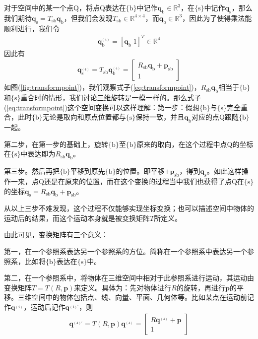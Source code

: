 \documentclass[12pt, a4paper, article, UTF8]{ctexart}
\begin{document}
对于空间中的某一个点Q，将点Q表达在$\{\text{b}\}$中记作$\mathbf{q}_\text{b}\in \mathbb{R}^3$，在$\{\text{s}\}$中记作$\mathbf{q}_\text{s}$，那么我们期待$\mathbf{q}_\text{s} = T_\text{sb}\mathbf{q}_\text{b}$，但我们会发现$T_\text{sb}\in\mathbb{R}^{4\times 4}$，而$\mathbf{q}_\text{b}\in\mathbb{R}^3$，因此为了使得乘法能顺利进行，我们令
\begin{align}
\mathbf{q}_\text{b}^{{}_{(4)}} = [\mathbf{q}_\text{b} \; 1]^T \in \mathbb{R}^4
\end{align}
因此有
\begin{align}
\mathbf{q}_\text{s}^{{}_{(4)}} = T_\text{sb}\mathbf{q}_\text{b}^{{}_{(4)}}  = \begin{bmatrix}
R_\text{sb} \mathbf{q}_\text{b} + \mathbf{p}_\text{sb} \\
1
\end{bmatrix} \label{eq:transformpoint}
\end{align}
如图(\ref{fig:transformpoint})，我们观察式子(\ref{eq:transformpoint})，$R_\text{sb}\mathbf{q}_\text{b}$相当于$\{\text{b}\}$和$\{\text{s}\}$重合时的情形，我们讨论三维旋转是一模一样的。那么式子(\ref{eq:transformpoint})这个空间变换可以这样理解：第一步：假想$\{\text{b}\}$与$\{\text{s}\}$完全重合，此时$\{\text{b}\}$无论是取向和原点位置都与$\{\text{s}\}$保持一致，并且$\mathbf{q}_\text{b}$对应的点Q跟随$\{\text{b}\}$一起。

第二步，在第一步的基础上，旋转$\{\text{b}\}$至$\{\text{b}\}$原来的取向，在这个过程中点Q的坐标在$\{\text{s}\}$中表达即为$R_\text{sb}\mathbf{q}_\text{b}$。

第三步。然后再把$\{\text{b}\}$平移到原先$\{\text{b}\}$的位置。即平移$+\mathbf{p}_\text{sb}$，得到$\mathbf{q}_\text{s}$。如此这样操作一来，点Q还是在原来的位置，而在这个变换的过程当中我们也获得了点Q在$\{\text{s}\}$的坐标$\mathbf{q}_\text{s} = R_\text{sb}\mathbf{q}_\text{b} +\mathbf{p}_\text{sb}$。

从以上三步不难发现，这个过程不仅能够实现坐标变换；也可以描述空间中物体的运动后的结果，而这个运动本身就是被变换矩阵$T$所定义。

由此可见，变换矩阵有三个意义：

第一，在一个参照系表达另一个参照系的方位。简称在一个参照系中表达另一个参照系，比如将$\{\text{b}\}$表达在$\{\text{s}\}$中。

第二，在一个参照系中，将物体在三维空间中相对于此参照系进行运动，其运动由变换矩阵$T=T(R,\mathbf{p})$来定义。具体为：先对物体进行$R$的旋转，再进行$\mathbf{p}$的平移。三维空间中的物体包括点、线、向量、平面、几何体等。比如某点在运动前记作$\mathbf{q}^{{}_{(4)}}$，运动后记作$\mathbf{q}^{{}_{(4)'}}$，则
\begin{align}
\mathbf{q}^{{}_{(4)'}} =T(R,\mathbf{p})\mathbf{q}^{{}_{(4)}} = \begin{bmatrix}
R\mathbf{q}^{{}_{(4)}} + \mathbf{p}\\1
\end{bmatrix}
\end{align}
\end{document}

